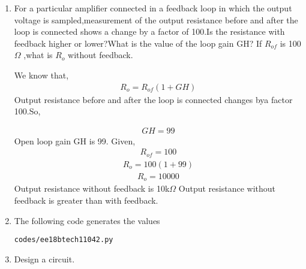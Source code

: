\begin{enumerate}[label=\thesubsection.\arabic*.,ref=\thesubsection.\theenumi]


\item For a particular amplifier connected in a feedback loop in which the output voltage is sampled,measurement of the output resistance before and after the loop is connected shows a change by a factor of 100.Is the resistance with feedback higher or lower?What is the value of the loop gain GH? If $R_{of}$ is 100 $\Omega$ ,what is $R_o$ without feedback.

\solution
We know that,
\begin{align}
    R_o = R_{of}(1+GH)
    \label{eq:ee18btech11042_1}
\end{align}
Output resistance before and after the loop is connected changes bya factor 100.So,

\begin{align}
    GH =99
\end{align}
Open loop gain GH is  99.
\newline
Given,
\begin{align}
    R_{of} = 100 
    \label{eq:ee18btech11042_3}
\end{align}
\begin{align}
    R_o = 100(1+99)
    \label{eq:ee18btech11042_4}
\end{align}
\begin{align}
    R_o = 10000
    \label{eq:ee18btech11042_5}
\end{align}
Output resistance without feedback  is   10k$\Omega$
\newline
Output resistance without feedback is greater than with feedback.
\item
The following code generates the values
\begin{lstlisting}
codes/ee18btech11042.py
\end{lstlisting}

\item Design a circuit.
\solution



\end{enumerate}
